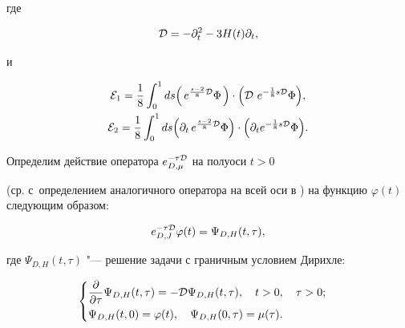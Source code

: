 где

$$

{\cal D}=-\partial _t^2-3H(t)\partial_t,$$

и

\begin{gather*}


{\cal E}_{1}=  \frac{1}{8}\int_0^1 ds\Bigl(\,

e^{\frac{s-2}{8}{\cal D}}

\Phi \,\Bigr)\cdot

\Bigl({\cal D}\,\,

e^{-\frac{1}{8} s {\cal D}} \Phi\Bigr),\\


{\cal E}_2= \frac{1}{8} \int_0^1 ds\Bigl(\partial_t

\,e^{\frac{s-2}{8}{\cal D}}

\Phi \Bigr)\cdot

\Bigl(\partial_t

e^{-\frac{1}{8}s{\cal D}} \Phi\Bigr).

\end{gather*}



Определим действие оператора $e^{-\tau\cal D}_{D,\mu}$ на полуоси $t>0$

(ср. с~определением аналогичного оператора на всей оси в \cite{Joukovskaya:2007nq,MN:2008,Barnaby:2008vs,CalNard:2010}) на функцию $\varphi(t)$ следующим образом:

\begin{equation*}

e^{-\tau\cal D}_{D,J}\varphi(t)=\Psi_{D,H}(t,\tau),

\end{equation*}

где $\Psi_{D,H}(t,\tau)$ "--- решение задачи с граничным условием Дирихле:

\begin{equation}

\label{H-bc-ic-w-m}

\begin{cases}

\displaystyle

\frac{\partial}{\partial \tau}\Psi_{D,H}(t,\tau)=

-{\cal D}\Psi_{D,H}(t,\tau),\quad t>0,\quad \tau>0; \vspace{1mm}\\

\Psi_{D,H}(t, 0)=\varphi(t),\quad  \Psi_{D,H}(0,\tau)=\mu(\tau).

\end{cases}\end{equation}



